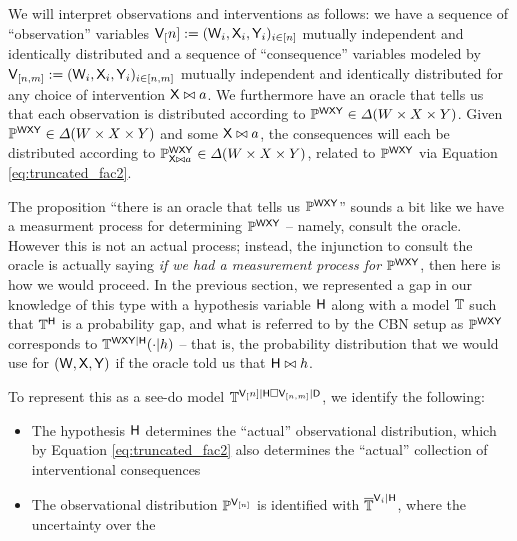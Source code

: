 We will interpret observations and interventions as follows: we have a sequence of ``observation'' variables $\mathsf{V}_[n]:=(\mathsf{W}_i,\mathsf{X}_i,\mathsf{Y}_i)_{i\in [n]}$ mutually independent and identically distributed and a sequence of ``consequence'' variables modeled by $\mathsf{V}_{[n,m]}:=(\mathsf{W}_i,\mathsf{X}_i,\mathsf{Y}_i)_{i\in [n,m]}$ mutually independent and identically distributed for any choice of intervention $\mathsf{X}\bowtie a$. We furthermore have an oracle that tells us that each observation is distributed according to $\mathbb{P}^{\mathsf{WXY}}\in \Delta(W\times X\times Y)$. Given $\mathbb{P}^{\mathsf{WXY}}\in \Delta(W\times X\times Y)$ and some $\mathsf{X}\bowtie a$, the consequences will each be distributed according to $\mathbb{P}_{\mathsf{X}\bowtie a}^{\mathsf{W}\mathsf{X}\mathsf{Y}}\in \Delta(W\times X\times Y)$, related to $\mathbb{P}^{\mathsf{WXY}}$ via Equation \ref{eq:truncated_fac2}.

The proposition ``there is an oracle that tells us $\mathbb{P}^{\mathsf{WXY}}$'' sounds a bit like we have a measurment process for determining $\mathbb{P}^{\mathsf{WXY}}$ -- namely, consult the oracle. However this is not an actual process; instead, the injunction to consult the oracle is actually saying \emph{if we had a measurement process for} $\mathbb{P}^{\mathsf{WXY}}$, then here is how we would proceed. In the previous section, we represented a gap in our knowledge of this type with a hypothesis variable $\mathsf{H}$ along with a model $\mathbb{T}$ such that $\mathbb{T}^{\mathsf{H}}$ is a probability gap, and what is referred to by the CBN setup as $\mathbb{P}^{\mathsf{WXY}}$ corresponds to $\mathbb{T}^{\mathsf{WXY}|\mathsf{H}}(\cdot|h)$ -- that is, the probability distribution that we would use for $(\mathsf{W,X,Y})$ if the oracle told us that $\mathsf{H}\bowtie h$.

To represent this as a see-do model $\mathbb{T}^{\mathsf{V}_[n]|\mathsf{H}\square \mathsf{V}_{[n,m]}|\mathsf{D}}$, we identify the following:
\begin{itemize}
    \item The hypothesis $\mathsf{H}$ determines the ``actual'' observational distribution, which by Equation \ref{eq:truncated_fac2} also determines the ``actual'' collection of interventional consequences
    \item The observational distribution $\mathbb{P}^{\mathsf{V}_{[n]}}$ is identified with $\overline{\mathbb{T}}^{\mathsf{V}_i|\mathsf{H}}$, where the uncertainty over the 
\end{itemize}

